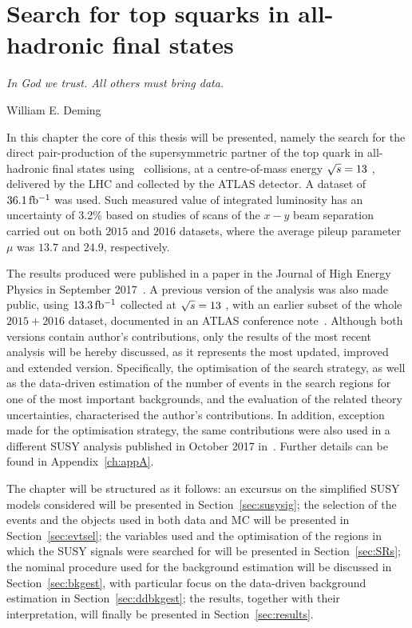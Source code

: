 \chapter[Search for top squarks in all-hadronic final states]{Search for top squarks in all-hadronic final states}
\label{ch:stop_ana}
\epigraph{\emph{In God we trust. All others must bring data.}}{William E. Deming}

	In this chapter the core of this thesis will be presented, namely the search for the direct pair-production of the supersymmetric partner of the top quark in all-hadronic final states using \pp\ collisions, at a centre-of-mass energy $\sqrt{s} = 13$ \TeV, delivered by the \ac{LHC} and collected by the \ac{ATLAS} detector. A dataset of $36.1\, \mbox{fb$^{-1}$}$ was used. Such measured value of integrated luminosity has an uncertainty of 3.2\% based on studies of scans of the $x-y$ beam separation carried out on both $2015$ and $2016$ datasets, where the average pileup parameter $\mu$ was $13.7$ and $24.9$, respectively.
		
	The results produced were published in a paper in the Journal of High Energy Physics in September 2017~\cite{stop0L}. A previous version of the analysis was also made public, using $13.3\,\mbox{fb$^{-1}$}$ collected at $\sqrt{s} = 13$ \TeV, with an earlier subset of the whole $2015+2016$ dataset, documented in an ATLAS conference note~\cite{ICHEPstop0L}. Although both versions contain author's contributions, only the results of the most recent analysis will be hereby discussed, as it represents the most updated, improved and extended version. Specifically, the optimisation of the search strategy, as well as the data-driven estimation of the number of events in the search regions for one of the most important backgrounds, and the evaluation of the related theory uncertainties, characterised the author's contributions. In addition, exception made for the optimisation strategy, the same contributions were also used in a different \ac{SUSY} analysis published in October 2017 in~\cite{DMhf}. Further details can be found in Appendix~\ref{ch:appA}.

	The chapter will be structured as it follows: an excursus on the simplified \ac{SUSY} models considered will be presented in Section~\ref{sec:susysig}; the selection of the events and the objects used in both data and \ac{MC} will be presented in Section~\ref{sec:evtsel}; the variables used and the optimisation of the regions in which the \ac{SUSY} signals were searched for will be presented in Section~\ref{sec:SRs}; the nominal procedure used  for the background estimation will be discussed in Section~\ref{sec:bkgest}, with particular focus on the data-driven background estimation in Section~\ref{sec:ddbkgest}; the results, together with their interpretation, will finally be presented in Section~\ref{sec:results}.


